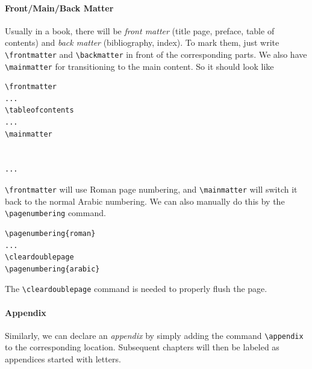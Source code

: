 \paragraph{Front/Main/Back Matter} Usually in a book, there will be \textit{front matter} (title page, preface, table of contents) and \textit{back matter} (bibliography, index). To mark them, just write \texttt{\textbackslash frontmatter} and \texttt{\textbackslash backmatter} in front of the corresponding parts. We also have \texttt{\textbackslash mainmatter} for transitioning to the main content. So it should look like
\begin{lstlisting}
\frontmatter
...
\tableofcontents
...
\mainmatter


...
\end{lstlisting}
\texttt{\textbackslash frontmatter} will use Roman page numbering, and \texttt{\textbackslash mainmatter} will switch it back to the normal Arabic numbering. We can also manually do this by the \texttt{\textbackslash pagenumbering} command.
\begin{lstlisting}
\pagenumbering{roman}
...
\cleardoublepage
\pagenumbering{arabic}
\end{lstlisting}
The \texttt{\textbackslash cleardoublepage} command is needed to properly flush the page.

\paragraph{Appendix} Similarly, we can declare an \textit{appendix} by simply adding the command \texttt{\textbackslash appendix} to the corresponding location. Subsequent chapters will then be labeled as appendices started with letters.

